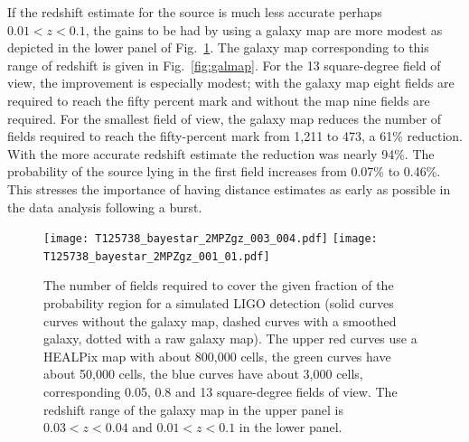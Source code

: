 \documentclass[useAMS,usenatbib]{mn2e}
\begin{document}
If the redshift estimate for the source is much less accurate perhaps
$0.01<z<0.1$, the gains to be had by using a galaxy map are more
modest as depicted in the lower panel of Fig.~\ref{fig:bayestar}.  The
galaxy map corresponding to this range of redshift is given in
Fig.~\ref{fig:galmap}.  For the 13 square-degree field of view, the
improvement is especially modest; with the galaxy map eight fields are
required to reach the fifty percent mark and without the map nine
fields are required.  For the smallest field of view, the galaxy map
reduces the number of fields required to reach the fifty-percent mark
from 1,211 to 473, a 61\% reduction.  With the more accurate redshift
estimate the reduction was nearly 94\%.  The probability of the source
lying in the first field increases from 0.07\% to 0.46\%.  This
stresses the importance of having distance estimates as early as
possible in the data analysis following a burst.
\begin{figure}
  \texttt{[image: T125738\_bayestar\_2MPZgz\_003\_004.pdf]}
  \texttt{[image: T125738\_bayestar\_2MPZgz\_001\_01.pdf]}
  \caption{The number of fields required to cover the given fraction
    of the probability region for a simulated LIGO detection (solid curves
    curves without the galaxy map, dashed curves with a smoothed
    galaxy, dotted with a raw galaxy map).  The upper red
    curves use a HEALPix map with about 800,000 cells, the green
    curves have about 50,000 cells, the blue curves have about
    3,000 cells,
    corresponding 0.05, 0.8  and 13 square-degree fields of
    view. The redshift range of the galaxy map in the upper panel is
    $0.03<z<0.04$ and $0.01<z<0.1$ in the lower panel.}
  \label{fig:bayestar}
\end{figure}
\end{document}
